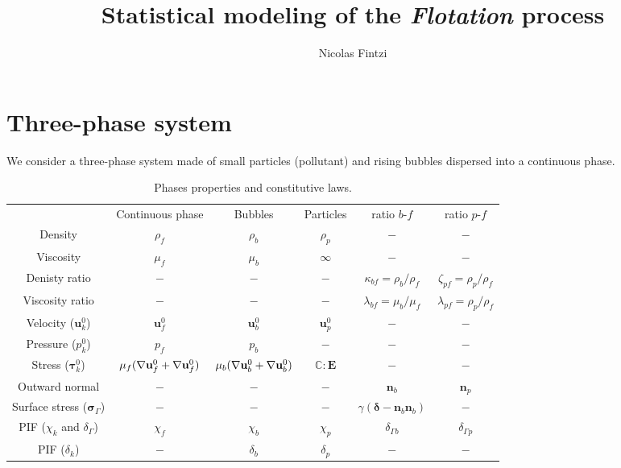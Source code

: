 \documentclass[12pt]{My_preprint}
\title{
    Statistical modeling of the \textit{Flotation} process
    }
\author[1,2]{Nicolas Fintzi}
\begin{document}
\maketitle

\begin{abstract}
\end{abstract}

\section{Three-phase system}

We consider a three-phase system made of small particles (pollutant) and rising bubbles dispersed into a continuous phase. 

\begin{table}[h!]
    \centering
    \begin{tabular}{cccccc}
        & Continuous phase  & Bubbles   & Particles & ratio $b$-$f$                       & ratio $p$-$f$\\
        Density         & $\rho_f$          & $\rho_b$  & $\rho_p$  & $-$&$-$ \\
        Viscosity       & $\mu_f$           & $\mu_b$   & $\infty$ &  $-$&$-$ \\
        Denisty ratio   &  $-$  &  $-$   &  $-$    & $\kappa_{bf} = \rho_b/\rho_f$     & $\zeta_{pf} = \rho_p/\rho_f$\\
        Viscosity ratio &  $-$  &  $-$   &  $-$    & $\lambda_{bf} = \mu_b/\mu_f$      & $\lambda_{pf} = \rho_p/\rho_f$\\
        Velocity ($\textbf{u}_k^0$) &    $\textbf{u}_f^0$        &  $\textbf{u}_b^0$   &  $\textbf{u}_p^0$    &    $-$   & $-$\\
        Pressure ($p_k^0$) &    $p_f$ &  $p_b$   &   $-$&  $-$& $-$\\
        Stress ($\bm\tau_k^0$) &    $\mu_f (\mathbf{\nabla} \textbf{u}_f^0 + \mathbf{\nabla} \textbf{u}_f^0) $        & $\mu_b (\mathbf{\nabla} \textbf{u}_b^0 + \mathbf{\nabla} \textbf{u}_b^0) $    & $\mathbb{C}:\textbf{E}$&  $-$     &$-$ \\
        Outward normal &     $-$       &   $-$  &  $-$    & $\textbf{n}_b$      & $\textbf{n}_p$\\
        Surface stress ($\bm\sigma_\Gamma$) &   $-$         &  $-$   &   $-$   & $\gamma  (\bm\delta -\textbf{n}_b\textbf{n}_b)$    &$-$ \\
        PIF ($\chi_k$ and $\delta_{\Gamma}$) &$\chi_f$& $\chi_b$    &  $\chi_p$    &  $\delta_{\Gamma b}$  & $\delta_{\Gamma p}$  \\
        PIF ($\delta_k$) &$-$& $\delta_b$    &  $\delta_p$    & $-$  & $-$ 
    \end{tabular}
    \caption{Phases properties and constitutive laws.}
\end{table}
\end{document}
